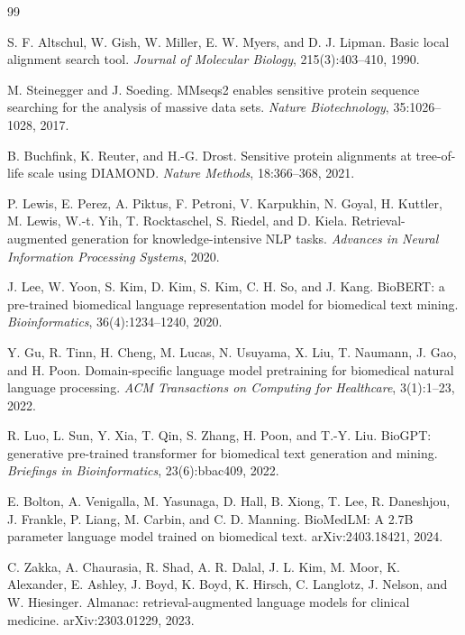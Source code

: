 \documentclass[11pt]{article}
\begin{document}
\begin{thebibliography}{99}
\small

S. F. Altschul, W. Gish, W. Miller, E. W. Myers, and D. J. Lipman.
Basic local alignment search tool.
\emph{Journal of Molecular Biology}, 215(3):403--410, 1990.

M. Steinegger and J. Soeding.
MMseqs2 enables sensitive protein sequence searching for the analysis of massive data sets.
\emph{Nature Biotechnology}, 35:1026--1028, 2017.

B. Buchfink, K. Reuter, and H.-G. Drost.
Sensitive protein alignments at tree-of-life scale using DIAMOND.
\emph{Nature Methods}, 18:366--368, 2021.

P. Lewis, E. Perez, A. Piktus, F. Petroni, V. Karpukhin, N. Goyal, H. Kuttler, M. Lewis, W.-t. Yih, T. Rocktaschel, S. Riedel, and D. Kiela.
Retrieval-augmented generation for knowledge-intensive NLP tasks.
\emph{Advances in Neural Information Processing Systems}, 2020.

J. Lee, W. Yoon, S. Kim, D. Kim, S. Kim, C. H. So, and J. Kang.
BioBERT: a pre-trained biomedical language representation model for biomedical text mining.
\emph{Bioinformatics}, 36(4):1234--1240, 2020.

Y. Gu, R. Tinn, H. Cheng, M. Lucas, N. Usuyama, X. Liu, T. Naumann, J. Gao, and H. Poon.
Domain-specific language model pretraining for biomedical natural language processing.
\emph{ACM Transactions on Computing for Healthcare}, 3(1):1--23, 2022.

R. Luo, L. Sun, Y. Xia, T. Qin, S. Zhang, H. Poon, and T.-Y. Liu.
BioGPT: generative pre-trained transformer for biomedical text generation and mining.
\emph{Briefings in Bioinformatics}, 23(6):bbac409, 2022.

E. Bolton, A. Venigalla, M. Yasunaga, D. Hall, B. Xiong, T. Lee, R. Daneshjou, J. Frankle, P. Liang, M. Carbin, and C. D. Manning.
BioMedLM: A 2.7B parameter language model trained on biomedical text.
arXiv:2403.18421, 2024.

C. Zakka, A. Chaurasia, R. Shad, A. R. Dalal, J. L. Kim, M. Moor, K. Alexander, E. Ashley, J. Boyd, K. Boyd, K. Hirsch, C. Langlotz, J. Nelson, and W. Hiesinger.
Almanac: retrieval-augmented language models for clinical medicine.
arXiv:2303.01229, 2023.


\end{thebibliography}
\end{document}
